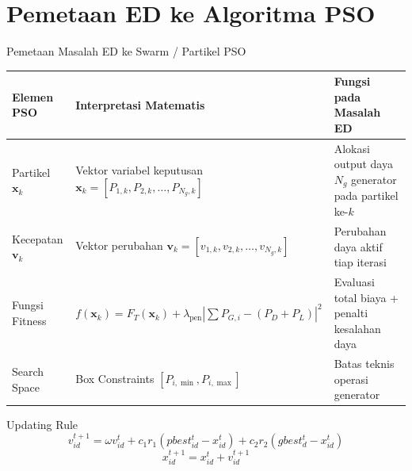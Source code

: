 \documentclass[10pt,aspectratio=169]{beamer}
\begin{document}
\section{Pemetaan ED ke Algoritma PSO}

\begin{frame}{Pemetaan Masalah ED ke Swarm / Partikel PSO}
    \begin{table}
        \centering
        \small
        \begin{tabular}{lp{5.5cm}p{5.5cm}}
            \toprule
            \textbf{Elemen PSO} & \textbf{Interpretasi Matematis} & \textbf{Fungsi pada Masalah ED} \\
            \midrule
            Partikel $\mathbf{x}_k$ & Vektor variabel keputusan $\mathbf{x}_k = [P_{1,k}, P_{2,k}, \dots, P_{N_g,k}]$ & Alokasi output daya $N_g$ generator pada partikel ke-$k$ \\
            Kecepatan $\mathbf{v}_k$ & Vektor perubahan $\mathbf{v}_k = [v_{1,k}, v_{2,k}, \dots, v_{N_g,k}]$ & Perubahan daya aktif tiap iterasi \\
            Fungsi Fitness & $f(\mathbf{x}_k) = F_T(\mathbf{x}_k) + \lambda_{\text{pen}} \left|\sum P_{G,i} - (P_D + P_L)\right|^2$ & Evaluasi total biaya + penalti kesalahan daya \\
            Search Space & Box Constraints $[P_{i,\min}, P_{i,\max}]$ & Batas teknis operasi generator \\
            \bottomrule
        \end{tabular}
    \end{table}

    \vspace{0.2cm}
    \begin{alertblock}{Updating Rule}
        \[
            v_{id}^{t+1} = \omega v_{id}^t + c_1 r_1 (pbest_{id}^t - x_{id}^t) + c_2 r_2 (gbest_d^t - x_{id}^t)
        \]
        \[
            x_{id}^{t+1} = x_{id}^t + v_{id}^{t+1}
        \]
    \end{alertblock}
\end{frame}
\end{document}
